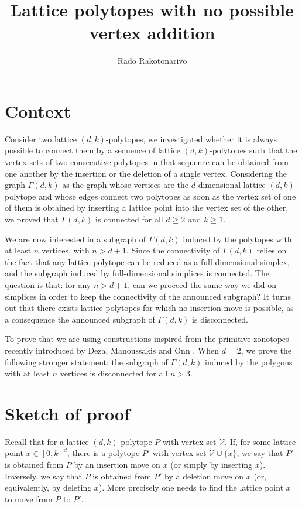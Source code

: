 \documentclass[a4paper]{article}
\begin{document}
\title{Lattice polytopes with no possible vertex addition}
\author{Rado Rakotonarivo}
\maketitle

\section{Context}

Consider two lattice $(d,k)$-polytopes, we investigated whether it is always possible to connect them by a sequence of lattice $(d,k)$-polytopes such that the vertex sets of two consecutive polytopes in that sequence can be obtained from one another by the insertion or the deletion of a single vertex. Considering the graph $\Gamma(d,k)$ as the graph whose vertices are the $d$-dimensional lattice $(d,k)$-polytope and whose edges connect two polytopes as soon as the vertex set of one of them is obtained by inserting a lattice point into the vertex set of the other, we proved that $\Gamma(d,k)$ is connected for all $d\geq2$ and $k\geq1$.

We are now interested in a subgraph of $\Gamma(d,k)$ induced by the polytopes with at least $n$ vertices, with $n>d+1$. Since the connectivity of $\Gamma(d,k)$ relies on the fact that any lattice polytope can be reduced as a full-dimensional simplex, and the subgraph induced by full-dimensional simplices is connected. The question is that: for any $n>d+1$, can we proceed the same way we did on simplices in order to keep the connectivity of the announced subgraph? It turns out that there exists lattice polytopes for which no insertion move is possible, as a consequence the announced subgraph of $\Gamma(d,k)$ is disconnected.

To prove that we are using constructions inspired from the primitive zonotopes recently introduced by Deza, Manoussakis and Onn \cite{DezaManoussakisOnn2018}. When $d=2$, we prove the following stronger statement: the subgraph of $\Gamma(d,k)$ induced by the polygons with at least $n$ vertices is disconnected for all $n>3$.



\section{Sketch of proof}

Recall that for a lattice $(d,k)$-polytope $P$ with vertex set $\mathcal{V}$. If, for some lattice point $x\in[0,k]^d$, there is a polytope $P'$ with vertex set $\mathcal{V}\cup\{x\}$, we say that $P'$ is obtained from $P$ by an insertion move on $x$ (or simply by inserting $x$). Inversely, we say that $P$ is obtained from $P'$ by a deletion move on $x$ (or, equivalently, by deleting $x$). More precisely one needs to find the lattice point $x$ to move from $P$ to $P'$.
\end{document}
